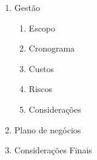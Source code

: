 \documentclass[a4paper]{article}
\begin{document}
\begin{enumerate}[label*=\arabic*.]
	\item Gestão
	\begin{enumerate}[label*=\arabic*.]
		\item Escopo
		\item Cronograma
		\item Custos
		\item Riscos
		\item Considerações
	\end{enumerate}

	\item Plano de negócios
	
	\item Considerações Finais

\end{enumerate}


\nocite {KUCHEMANN2012,IEEE6091301,SLAU292G}



\end{document}
